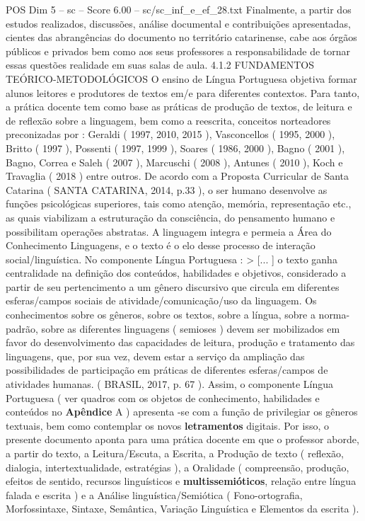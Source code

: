 \begin{textsample}{POS Dim 5 – sc – Score 6.00 – sc/sc\_inf\_e\_ef\_28.txt}
Finalmente, a partir dos estudos realizados, discussões, análise documental e contribuições apresentadas, cientes das abrangências do documento no território catarinense, cabe aos órgãos públicos e privados bem como aos seus professores a responsabilidade de tornar essas questões realidade em suas salas de aula. 4.1.2 FUNDAMENTOS TEÓRICO-METODOLÓGICOS O ensino de Língua Portuguesa objetiva formar alunos leitores e produtores de textos em/e para diferentes contextos.
Para tanto, a prática docente tem como base as práticas de produção de textos, de leitura e de reflexão sobre a linguagem, bem como a reescrita, conceitos norteadores preconizadas por : Geraldi ( 1997, 2010, 2015 ), Vasconcellos ( 1995, 2000 ), Britto ( 1997 ), Possenti ( 1997, 1999 ), Soares ( 1986, 2000 ), Bagno ( 2001 ), Bagno, Correa e Saleh ( 2007 ), Marcuschi ( 2008 ), Antunes ( 2010 ), Koch e Travaglia ( 2018 ) entre outros.
De acordo com a Proposta Curricular de Santa Catarina ( SANTA CATARINA, 2014, p.33 ), o ser humano desenvolve as funções psicológicas superiores, tais como atenção, memória, representação etc., as quais viabilizam a estruturação da consciência, do pensamento humano e possibilitam operações abstratas.
A linguagem integra e permeia a Área do Conhecimento Linguagens, e o texto é o elo desse processo de interação social/linguística.
No componente Língua Portuguesa : > [... ] o texto ganha centralidade na definição dos conteúdos, habilidades e objetivos, considerado a partir de seu pertencimento a um gênero discursivo que circula em diferentes esferas/campos sociais de atividade/comunicação/uso da linguagem.
Os conhecimentos sobre os gêneros, sobre os textos, sobre a língua, sobre a norma-padrão, sobre as diferentes linguagens ( semioses ) devem ser mobilizados em favor do desenvolvimento das capacidades de leitura, produção e tratamento das linguagens, que, por sua vez, devem estar a serviço da ampliação das possibilidades de participação em práticas de diferentes esferas/campos de atividades humanas. ( BRASIL, 2017, p. 67 ).
Assim, o componente Língua Portuguesa ( ver quadros com os objetos de conhecimento, habilidades e conteúdos no \textbf{Apêndice} A ) apresenta -se com a função de privilegiar os gêneros textuais, bem como contemplar os novos \textbf{letramentos} digitais.
Por isso, o presente documento aponta para uma prática docente em que o professor aborde, a partir do texto, a Leitura/Escuta, a Escrita, a Produção de texto ( reflexão, dialogia, intertextualidade, estratégias ), a Oralidade ( compreensão, produção, efeitos de sentido, recursos linguísticos e \textbf{multissemióticos}, relação entre língua falada e escrita ) e a Análise linguística/Semiótica ( Fono-ortografia, Morfossintaxe, Sintaxe, Semântica, Variação Linguística e Elementos da escrita ).

\end{textsample}
